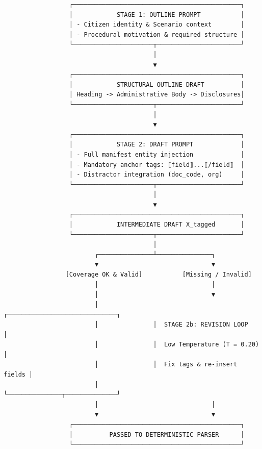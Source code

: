\documentclass[
  11pt,
  a4paper,
]{article}
\begin{document}
\begin{verbatim}
                  ┌──────────────────────────────────────────────┐
                  │            STAGE 1: OUTLINE PROMPT           │
                  │ - Citizen identity & Scenario context        │
                  │ - Procedural motivation & required structure │
                  └──────────────────────┬───────────────────────┘
                                         │
                                         ▼
                  ┌──────────────────────────────────────────────┐
                  │            STRUCTURAL OUTLINE DRAFT          │
                  │ Heading -> Administrative Body -> Disclosures│
                  └──────────────────────┬───────────────────────┘
                                         │
                                         ▼
                  ┌──────────────────────────────────────────────┐
                  │            STAGE 2: DRAFT PROMPT             │
                  │ - Full manifest entity injection             │
                  │ - Mandatory anchor tags: ⟦field⟧...⟦/field⟧  │
                  │ - Distractor integration (doc_code, org)     │
                  └──────────────────────┬───────────────────────┘
                                         │
                                         ▼
                  ┌──────────────────────────────────────────────┐
                  │            INTERMEDIATE DRAFT X_tagged       │
                  └──────────────────────┬───────────────────────┘
                                         │
                         ┌───────────────┴───────────────┐
                         ▼                               ▼
                 [Coverage OK & Valid]           [Missing / Invalid]
                         │                               │
                         │                               ▼
                         │               ┌──────────────────────────────┐
                         │               │  STAGE 2b: REVISION LOOP     │
                         │               │  Low Temperature (T = 0.20)  │
                         │               │  Fix tags & re-insert fields │
                         │               └───────────────┬──────────────┘
                         │                               │
                         ▼                               ▼
                  ┌──────────────────────────────────────────────┐
                  │          PASSED TO DETERMINISTIC PARSER      │
                  └──────────────────────────────────────────────┘
\end{verbatim}
\end{document}
